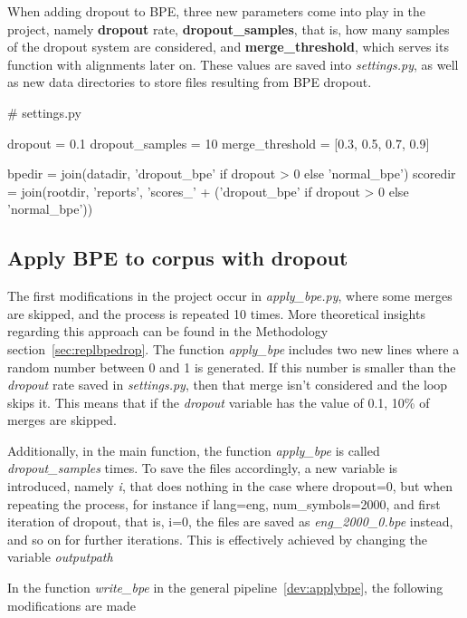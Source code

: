 When adding dropout to BPE, three new parameters come into play in the project, namely \textbf{dropout} rate, \textbf{dropout\_samples}, that is, how many samples of the dropout system are considered, and \textbf{merge\_threshold}, which serves its function with alignments later on. These values are saved into \emph{settings.py}, as well as new data directories to store files resulting from BPE dropout.

\begin{python}
# settings.py

dropout = 0.1
dropout_samples = 10
merge_threshold = [0.3, 0.5, 0.7, 0.9]

bpedir = join(datadir, 'dropout_bpe' if dropout > 0 else 'normal_bpe')
scoredir = join(rootdir, 'reports', 'scores_' + ('dropout_bpe' if dropout > 0 else 'normal_bpe'))
\end{python}

\subsection{Apply BPE to corpus with dropout}

The first modifications in the project occur in \emph{apply\_bpe.py}, where some merges are skipped, and the process is repeated 10 times. More theoretical insights regarding this approach can be found in the Methodology section~\ref{sec:replbpedrop}. The function \emph{apply\_bpe} includes two new lines where a random number between 0 and 1 is generated. If this number is smaller than the \emph{dropout} rate saved in \emph{settings.py}, then that merge isn't considered and the loop skips it. This means that if the \emph{dropout} variable has the value of 0.1, 10\% of merges are skipped.

Additionally, in the main function, the function \emph{apply\_bpe} is called \emph{dropout\_samples} times. To save the files accordingly, a new variable is introduced, namely \emph{i}, that does nothing in the case where dropout=0, but when repeating the process, for instance if lang=eng, num\_symbols=2000, and first iteration of dropout, that is, i=0, the files are saved as \emph{eng\_2000\_0.bpe} instead, and so on for further iterations. This is effectively achieved by changing the variable \emph{outputpath}

In the function \emph{write\_bpe} in the general pipeline~\ref{dev:applybpe}, the following modifications are made

